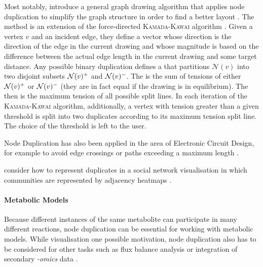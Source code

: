 \documentclass[
	fontsize=10pt, %
	twoside=false, %
	secnumdepth=1, %
  toc=indentunnumbered %
]{kaobook}
\begin{document}
Most notably, \citeauthor{eades_VertexSplittingTensionfree_1996} introduce a
general graph drawing algorithm that applies node duplication to simplify the
graph structure in order to find a better layout
\cite{eades_VertexSplittingTensionfree_1996}. The method is an extension of the
force-directed \textsc{Kamada-Kawai} algorithm
\cite{kamada_AlgorithmDrawingGeneral_1989}. Given a vertex $v$ and an incident
edge, they define a  vector whose direction is the direction of the
edge in the current drawing and whose magnitude is based on the difference
between the actual edge length in the current drawing and some target distance.
Any possible binary duplication defines a  that partitions
$\mathcal{N}(v)$ into two disjoint subsets $\mathcal{N}(v)^+$ and $\mathcal{N}(v)^-$.
The  is the sum of tensions of either
$\mathcal{N}(v)^+$ or $\mathcal{N}(v)^-$ (they are in fact equal if the drawing is
in equilibrium). The  then is the maximum tension of all
possible split lines. In each iteration of the \textsc{Kamada-Kawai} algorithm,
additionally, a vertex with tension greater than a given threshold is split
into two duplicates according to its maximum tension split line. The choice of
the threshold is left to the user.

Node Duplication has also been applied in the area of Electronic Circuit Design,
for example to avoid edge crossings \cite{li_EliminateWireCrossings_2008} or
paths exceeding a maximum length \cite{paik_VertexSplittingDags_1998} \cite{mayer_GeneticAlgorithmsVertex_1993}.

\citeauthor{henr_ImprovingReadabilityClustered_2008}
 consider how to represent
duplicates in a social network visualisation in which communities are
represented by adjacency heatmaps
\cite{henr_ImprovingReadabilityClustered_2008}.


\paragraph{Metabolic Models}
Because different instances of the same metabolite can participate in many
different reactions, node duplication can be essential for working with
metabolic models. While visualisation one possible motivation, node duplication
also has to be considered for other tasks such as flux balance analysis
or integration of secondary \textit{-omics} data \cite{manipur_clustering_2020}.
\end{document}
